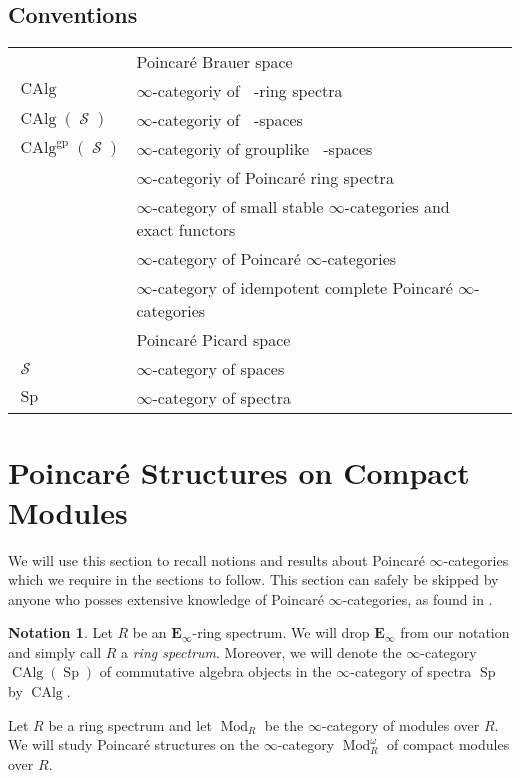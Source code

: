 \documentclass{article}
\DeclareMathOperator{\Brp}{Br^p} %
\DeclareMathOperator{\CAlg}{CAlg} %
\DeclareMathOperator{\CAlgp}{CAlg^p} %
\DeclareMathOperator{\Cat}{\mathcal{C}at} %
\DeclareMathOperator{\Catex}{\Cat_\infty^{ex}} %
\DeclareMathOperator{\Catp}{Cat^p_\infty} %
\DeclareMathOperator{\Catpidem}{Cat^p_{\infty, idem}} %
\DeclareMathOperator{\Einfty}{\mathbf{E}_\infty} %
\DeclareMathOperator{\gp}{gp} %
\DeclareMathOperator{\Mod}{Mod} %
\DeclareMathOperator{\Picp}{Pic^p} %
\DeclareMathOperator{\Spectra}{Sp} %
\DeclareMathOperator{\Spaces}{\mathcal{S}} %
\theoremstyle{definition}
\newtheorem{notation}[equation]{Notation}
\begin{document}
\subsection{Conventions}
\label{subsection:conventions}
    \begin{longtable}{lll}
        $\Brp$ & Poincaré Brauer space\\
        $\CAlg$ & $\infty$-categoriy of $\Einfty$-ring spectra\\
        $\CAlg(\Spaces)$ & $\infty$-categoriy of $\Einfty$-spaces\\
        $\CAlg^{\gp}(\Spaces)$ & $\infty$-categoriy of grouplike $\Einfty$-spaces\\
        $\CAlgp$ & $\infty$-categoriy of Poincaré ring spectra\\
        $\Catex$ & $\infty$-category of small stable $\infty$-categories and exact functors\\
        $\Catp$ & $\infty$-category of Poincaré $\infty$-categories\\
        $\Catpidem$ & $\infty$-category of idempotent complete Poincaré $\infty$-categories\\
        $\Picp$ & Poincaré Picard space\\
        $\Spaces$ & $\infty$-category of spaces\\
        $\Spectra$ & $\infty$-category of spectra
    \end{longtable}

\section{Poincaré Structures on Compact Modules}
\label{section:poincare_structures_on_compact_modules}
We will use this section to recall notions and results about Poincaré $\infty$-categories which we require in the sections to follow. This section can safely be skipped by anyone who posses extensive knowledge of Poincaré $\infty$-categories, as found in \cite{CDHHLMNNSI}.

\begin{notation}
    \label{notation:omission_of_e_infty}
    Let $R$ be an $\mathbf{E}_\infty$-ring spectrum. We will drop $\mathbf{E}_\infty$ from our notation and simply call $R$ a \emph{ring spectrum}. Moreover, we will denote the $\infty$-category $\CAlg(\Spectra)$ of commutative algebra objects in the $\infty$-category of spectra $\Spectra$ by $\CAlg$. 
\end{notation}

Let $R$ be a ring spectrum and let $\Mod_R$ be the $\infty$-category of modules over $R$. We will study Poincaré structures on the $\infty$-category $\Mod_R^\omega$ of compact modules over $R$. 
\end{document}
